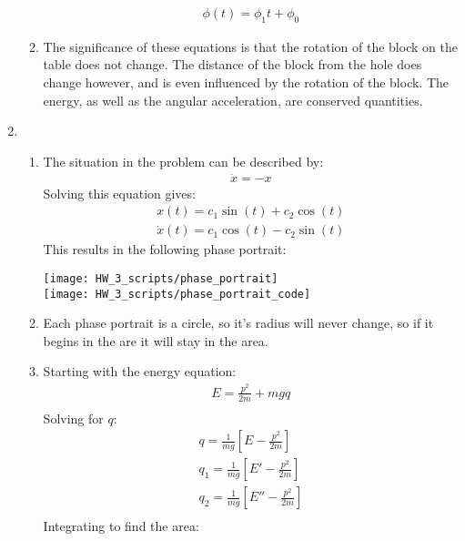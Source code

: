 \documentclass[12pt]{article}
\begin{document}
\begin{enumerate}
\begin{enumerate}
\begin{gather*}
        \phi(t)=\phi_1 t+\phi_0
      \end{gather*}
      \item
      The significance of these equations is that the rotation of the block on the table does not change.
      The distance of the block from the hole does change however, and is even influenced by the rotation of the block.
      The energy, as well as the angular acceleration, are conserved quantities.
    \end{enumerate}
    \item
    \begin{enumerate}
      \item
      The situation in the problem can be described by:
      \begin{gather*}
        \ddot{x}=-x
      \end{gather*}
      Solving this equation gives:
      \begin{gather*}
        x(t)=c_1\sin(t)+c_2\cos(t)\\
        \dot{x}(t)=c_1\cos(t)-c_2\sin(t)
      \end{gather*}
      This results in the following phase portrait:\\
      \linebreak
      \begin{center}
        \texttt{[image: HW\_3\_scripts/phase\_portrait]}\\
        \texttt{[image: HW\_3\_scripts/phase\_portrait\_code]}
      \end{center}
      \item Each phase portrait is a circle, so it's radius will never change, so if it begins in the are it will stay in the area.
      \item
      Starting with the energy equation:
      \begin{gather*}
        E=\frac{p^2}{2m}+mgq\\
      \end{gather*}
      Solving for $q$:
      \begin{gather*}
        q=\frac{1}{mg}\left[E-\frac{p^2}{2m}\right]\\
        q_1=\frac{1}{mg}\left[E'-\frac{p^2}{2m}\right]\\
        q_2=\frac{1}{mg}\left[E''-\frac{p^2}{2m}\right]\\
      \end{gather*}
      Integrating to find the area:
      \begin{gather*}

\end{gather*}
\end{enumerate}
\end{enumerate}
\end{document}
